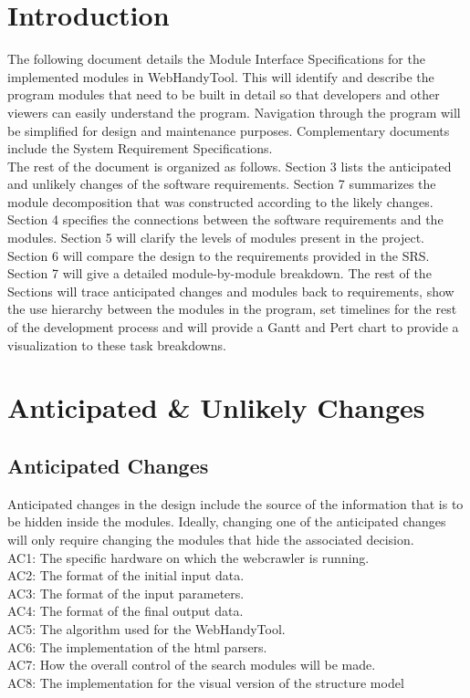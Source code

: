 \documentclass[titlepage]{article}
\begin{document}
\section{Introduction}
The following document details the Module Interface Specifications for the implemented modules in WebHandyTool. This will identify and describe the program modules that need to be built in detail so that developers and other viewers can easily understand the program.  Navigation through the program will be simplified for design and maintenance purposes. Complementary documents include the System Requirement Specifications.\\

The rest of the document is organized as follows. Section 3 lists the anticipated and unlikely changes of the software requirements. Section 7 summarizes the module decomposition that was constructed according to the likely changes. Section 4 specifies the connections between the software requirements and the modules. Section 5 will clarify the levels of modules present in the project. Section 6 will compare the design to the requirements provided in the SRS. Section 7 will give a detailed module-by-module breakdown. The rest of the Sections  will trace anticipated changes and modules back to requirements, show the use hierarchy between the modules in the program, set timelines for the rest of the development process and will provide a Gantt and Pert chart to provide a visualization to these task breakdowns.


\section{Anticipated \& Unlikely Changes}
\subsection{Anticipated Changes}
Anticipated changes in the design include the source of the information that is to be hidden inside the modules. Ideally, changing one of the anticipated changes will only require changing the modules that hide the associated decision.\\

\noindent
AC1: The specific hardware on which the webcrawler is running.\\
AC2: The format of the initial input data.\\
AC3: The format of the input parameters.\\
AC4: The format of the final output data.\\
AC5: The algorithm used for the WebHandyTool.\\
AC6: The implementation of the html parsers.\\
AC7: How the overall control of the search modules will be made.\\
AC8: The implementation for the visual version of the structure model\\
\end{document}
